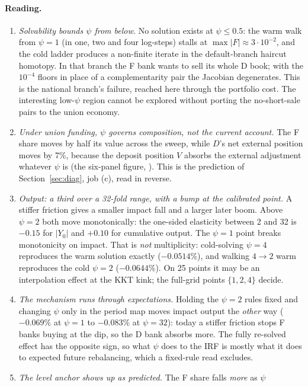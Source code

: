 \paragraph{Reading.}
\begin{enumerate}
\item \emph{Solvability bounds $\psi$ from below.} No solution exists at $\psi\le0.5$: the warm
walk from $\psi=1$ (in one, two and four log-steps) stalls at $\max|F|\approx3\cdot10^{-2}$, and
the cold ladder produces a non-finite iterate in the default-branch haircut homotopy. In that
branch the F bank wants to sell its whole D book; with the $10^{-4}$ floors in place of a
complementarity pair the Jacobian degenerates. This is the national branch's failure, reached
here through the portfolio cost. The interesting low-$\psi$ region cannot be explored without
porting the no-short-sale pairs to the union economy.
\item \emph{Under union funding, $\psi$ governs composition, not the current account.} The F
share moves by half its value across the sweep, while $D$'s net external position moves by 7\%,
because the deposit position $V$ absorbs the external adjustment whatever $\psi$ is (the
six-panel figure, ). This is the prediction of
Section~\ref{sec:diag}, job (c), read in reverse.
\item \emph{Output: a third over a 32-fold range, with a bump at the calibrated point.} A
stiffer friction gives a smaller impact fall and a larger later boom. Above $\psi=2$ both move
monotonically: the one-sided elasticity between 2 and 32 is $-0.15$ for $|Y_0|$ and $+0.10$
for cumulative output. The $\psi=1$ point breaks monotonicity on impact. That is \emph{not}
multiplicity: cold-solving $\psi=4$ reproduces the warm solution exactly ($-0.0514\%$), and
walking $4\to2$ warm reproduces the cold $\psi=2$ ($-0.0644\%$). On 25 points it may be an
interpolation effect at the KKT kink; the full-grid points $\{1,2,4\}$ decide.
\item \emph{The mechanism runs through expectations.} Holding the $\psi=2$ rules fixed and
changing $\psi$ only in the period map moves impact output the \emph{other} way ($-0.069\%$ at
$\psi=1$ to $-0.083\%$ at $\psi=32$): today a stiffer friction stops F banks buying at the dip,
so the D bank absorbs more. The fully re-solved effect has the opposite sign, so what $\psi$
does to the IRF is mostly what it does to expected future rebalancing, which a fixed-rule read
excludes.
\item \emph{The level anchor shows up as predicted.} The F share falls \emph{more} as $\psi$

\end{enumerate}
